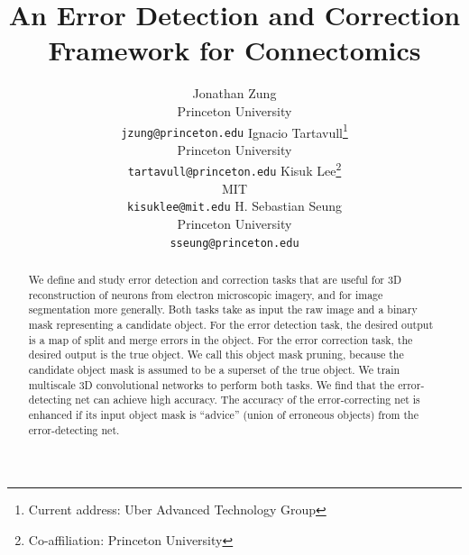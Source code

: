 \documentclass{article}
\title{An Error Detection and Correction Framework for Connectomics}
\author{
	Jonathan Zung\\
	Princeton University\\
	{\tt jzung@princeton.edu}
	\And
	Ignacio Tartavull\thanks{Current address: Uber Advanced Technology Group}\\
	Princeton University\\
	{\tt tartavull@princeton.edu}
	\And
	Kisuk Lee\thanks{Co-affiliation: Princeton University}\\
	MIT\\
	{\tt kisuklee@mit.edu}
	\And
    H. Sebastian Seung\\
	Princeton University\\
	{\tt sseung@princeton.edu}
}
\begin{document}
\maketitle

\begin{abstract}
We define and study error detection and correction tasks that are
useful for 3D reconstruction of neurons from electron microscopic
imagery, and for image segmentation more generally. Both tasks take as
input the raw image and a binary mask representing a candidate
object. For the error detection task, the desired output is a map of
split and merge errors in the object. For the error correction task,
the desired output is the true object. We call this object mask
pruning, because the candidate object mask is assumed to be a superset
of the true object. We train multiscale 3D convolutional networks to
perform both tasks. We find that the error-detecting net can achieve
high accuracy. The accuracy of the error-correcting net is enhanced if
its input object mask is ``advice'' (union of erroneous objects) from
the error-detecting net.
\end{abstract}
\end{document}
